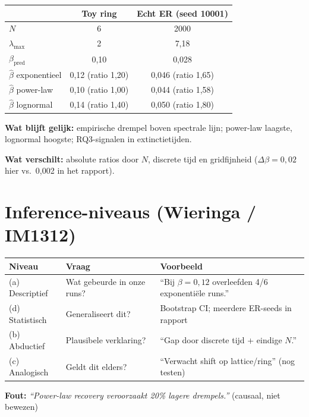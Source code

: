 \documentclass[11pt,a4paper]{article}
\begin{document}
\begin{center}
\begin{tabular}{@{}lcc@{}}
\toprule
 & Toy ring & Echt ER (seed 10001) \\
\midrule
$N$ & 6 & 2000 \\
$\lambda_{\max}$ & 2 & 7,18 \\
$\beta_{\mathrm{pred}}$ & 0,10 & 0,028 \\
$\hat\beta$ exponentieel & 0,12 (ratio 1,20) & 0,046 (ratio 1,65) \\
$\hat\beta$ power-law & 0,10 (ratio 1,00) & 0,044 (ratio 1,58) \\
$\hat\beta$ lognormal & 0,14 (ratio 1,40) & 0,050 (ratio 1,80) \\
\bottomrule
\end{tabular}
\end{center}

\textbf{Wat blijft gelijk:} empirische drempel boven spectrale lijn; power-law laagste, lognormal hoogste; RQ3-signalen in extinctietijden.

\textbf{Wat verschilt:} absolute ratios door $N$, discrete tijd en gridfijnheid ($\Delta\beta = 0{,}02$ hier vs.\ 0,002 in het rapport).

\section{Inference-niveaus (Wieringa / IM1312)}

\begin{center}
\small
\begin{tabular}{@{}p{2.2cm}p{4.2cm}p{7.5cm}@{}}
\toprule
\textbf{Niveau} & \textbf{Vraag} & \textbf{Voorbeeld} \\
\midrule
(a) Descriptief & Wat gebeurde in onze runs? & ``Bij $\beta{=}0{,}12$ overleefden 4/6 exponenti\"ele runs.'' \\
(d) Statistisch & Generaliseert dit? & Bootstrap CI; meerdere ER-seeds in rapport \\
(b) Abductief & Plausibele verklaring? & ``Gap door discrete tijd + eindige $N$.'' \\
(c) Analogisch & Geldt dit elders? & ``Verwacht shift op lattice/ring'' (nog testen) \\
\bottomrule
\end{tabular}
\end{center}

\vspace{0.5em}
\textbf{Fout:} \emph{``Power-law recovery veroorzaakt 20\% lagere drempels.''} (causaal, niet bewezen)
\end{document}

